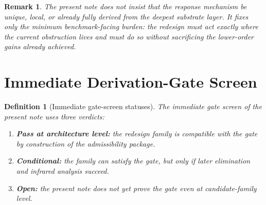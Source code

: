 \documentclass[11pt]{article}
\newtheorem{definition}{Definition}
\newtheorem{remark}{Remark}
\begin{document}
\begin{remark}
The present note does not insist that the response mechanism be unique, local, or already fully derived from the deepest substrate layer. It fixes only the minimum benchmark-facing burden: the redesign must act exactly where the current obstruction lives and must do so without sacrificing the lower-order gains already achieved.
\end{remark}

\section{Immediate Derivation-Gate Screen}

\begin{definition}[Immediate gate-screen statuses]
\label{def:status}
The immediate gate screen of the present note uses three verdicts:
\begin{enumerate}
    \item \textbf{Pass at architecture level:} the redesign family is compatible with the gate by construction of the admissibility package.
    \item \textbf{Conditional:} the family can satisfy the gate, but only if later elimination and infrared analysis succeed.
    \item \textbf{Open:} the present note does not yet prove the gate even at candidate-family level.
\end{enumerate}
\end{definition}
\end{document}
